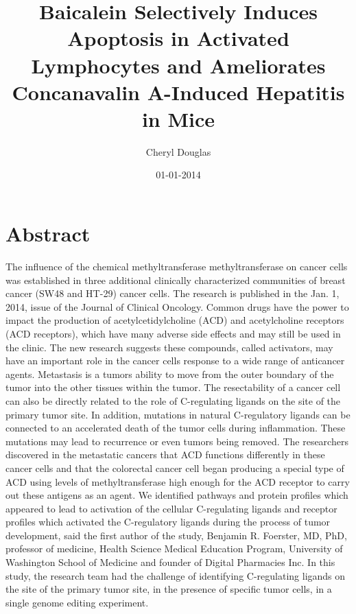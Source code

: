 \documentclass{article}%
\title{Baicalein Selectively Induces Apoptosis in Activated Lymphocytes and Ameliorates Concanavalin A{-}Induced Hepatitis in Mice}%
\author{Cheryl Douglas}%
\affil{Departments of Medicine, Biochemistry and Molecular Biology, Indiana University School of Medicine, The Melvin and Bren Simon Cancer Center and the Center for Pancreatic Cancer Research, Indianapolis, Indiana, United States of America}%
\date{01{-}01{-}2014}%
\begin{document}
%
\normalsize%
\maketitle%
\section{Abstract}%
\label{sec:Abstract}%
The influence of the chemical methyltransferase methyltransferase on cancer cells was established in three additional clinically characterized communities of breast cancer (SW48 and HT{-}29) cancer cells.\newline%
The research is published in the Jan. 1, 2014, issue of the Journal of Clinical Oncology.\newline%
Common drugs have the power to impact the production of acetylcetidylcholine (ACD) and acetylcholine receptors (ACD receptors), which have many adverse side effects and may still be used in the clinic. The new research suggests these compounds, called activators, may have an important role in the cancer cells response to a wide range of anticancer agents.\newline%
Metastasis is a tumors ability to move from the outer boundary of the tumor into the other tissues within the tumor. The resectability of a cancer cell can also be directly related to the role of C{-}regulating ligands on the site of the primary tumor site. In addition, mutations in natural C{-}regulatory ligands can be connected to an accelerated death of the tumor cells during inflammation. These mutations may lead to recurrence or even tumors being removed.\newline%
The researchers discovered in the metastatic cancers that ACD functions differently in these cancer cells and that the colorectal cancer cell began producing a special type of ACD using levels of methyltransferase high enough for the ACD receptor to carry out these antigens as an agent.\newline%
We identified pathways and protein profiles which appeared to lead to activation of the cellular C{-}regulating ligands and receptor profiles which activated the C{-}regulatory ligands during the process of tumor development, said the first author of the study, Benjamin R. Foerster, MD, PhD, professor of medicine, Health Science Medical Education Program, University of Washington School of Medicine and founder of Digital Pharmacies Inc.\newline%
In this study, the research team had the challenge of identifying C{-}regulating ligands on the site of the primary tumor site, in the presence of specific tumor cells, in a single genome editing experiment.\newline%
\end{document}
